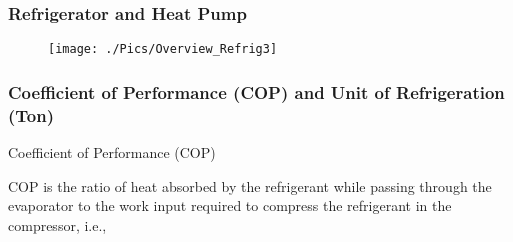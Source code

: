 \documentclass[10pt,compress,handout,unknownkeysallowed]{beamer}
\begin{document}
\begin{frame}
 \frametitle{Refrigerator and Heat Pump}
    \begin{figure}%
     \begin{center}
      \texttt{[image: ./Pics/Overview\_Refrig3]}
     \end{center}
    \end{figure}
\end{frame}


\begin{frame}
 \frametitle{Coefficient of Performance (COP) and Unit of Refrigeration (Ton)}
    \begin{block}{\begin{center}\scriptsize Coefficient of Performance (COP)\end{center}}\scriptsize
        COP is the ratio of heat absorbed by the refrigerant while passing through the evaporator to the work input required to compress the refrigerant in the compressor, i.e., 
    \end{block}
\end{frame}
\end{document}

